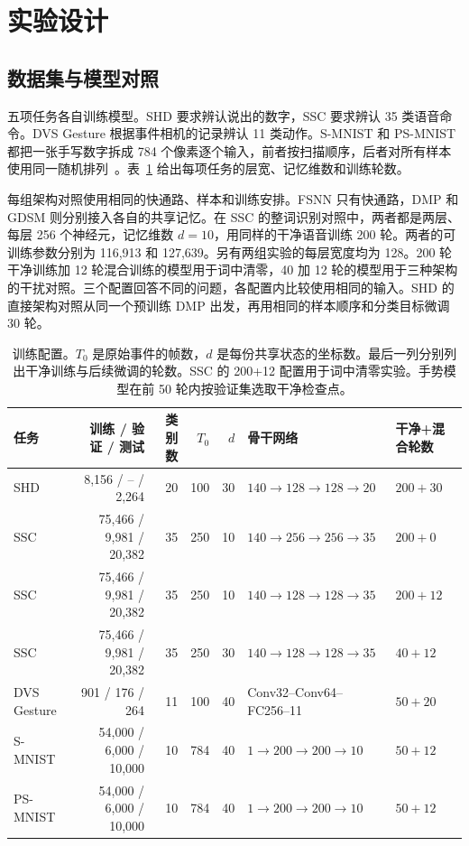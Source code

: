 \documentclass[11pt]{article}
\newcommand{\pid}[1]{\ifstrequal{#1}{摘要}{}{\leavevmode\llap{\scriptsize\sffamily #1\hspace{.65em}}}\ignorespaces}
\begin{document}
\section{实验设计}
\subsection{数据集与模型对照}
\pid{3.1-P1} 五项任务各自训练模型。SHD 要求辨认说出的数字，SSC 要求辨认 35 类语音命令。DVS Gesture 根据事件相机的记录辨认 11 类动作。S-MNIST 和 PS-MNIST 都把一张手写数字拆成 784 个像素逐个输入，前者按扫描顺序，后者对所有样本使用同一随机排列~\cite{shd,gesture,mnist}。表~\ref{tab:protocol} 给出每项任务的层宽、记忆维数和训练轮数。

\pid{3.1-P2} 每组架构对照使用相同的快通路、样本和训练安排。FSNN 只有快通路，DMP 和 GDSM 则分别接入各自的共享记忆。在 SSC 的整词识别对照中，两者都是两层、每层 256 个神经元，记忆维数 $d=10$，用同样的干净语音训练 200 轮。两者的可训练参数分别为 116,913 和 127,639。另有两组实验的每层宽度均为 128。200 轮干净训练加 12 轮混合训练的模型用于词中清零，40 加 12 轮的模型用于三种架构的干扰对照。三个配置回答不同的问题，各配置内比较使用相同的输入。SHD 的直接架构对照从同一个预训练 DMP 出发，再用相同的样本顺序和分类目标微调 30 轮。

\begin{table}[htbp]
\centering\small
\caption{训练配置。$T_0$ 是原始事件的帧数，$d$ 是每份共享状态的坐标数。最后一列分别列出干净训练与后续微调的轮数。SSC 的 200+12 配置用于词中清零实验。手势模型在前 50 轮内按验证集选取干净检查点。}
\label{tab:protocol}
\begin{lrbox}{\tablebox}\begin{tabular}{lrrrrll}
\toprule
任务 & 训练 / 验证 / 测试 & 类别数 & $T_0$ & $d$ & 骨干网络 & 干净+混合轮数\\
\midrule
SHD & 8,156 / -- / 2,264 & 20 & 100 & 30 & $140\to128\to128\to20$ & $200+30$\\
SSC & 75,466 / 9,981 / 20,382 & 35 & 250 & 10 & $140\to256\to256\to35$ & $200+0$\\
SSC & 75,466 / 9,981 / 20,382 & 35 & 250 & 10 & $140\to128\to128\to35$ & $200+12$\\
SSC & 75,466 / 9,981 / 20,382 & 35 & 250 & 30 & $140\to128\to128\to35$ & $40+12$\\
DVS Gesture & 901 / 176 / 264 & 11 & 100 & 40 & Conv32--Conv64--FC256--11 & $50+20$\\
S-MNIST & 54,000 / 6,000 / 10,000 & 10 & 784 & 40 & $1\to200\to200\to10$ & $50+12$\\
PS-MNIST & 54,000 / 6,000 / 10,000 & 10 & 784 & 40 & $1\to200\to200\to10$ & $50+12$\\
\bottomrule
\end{tabular}\end{lrbox}
\ifdim\wd\tablebox>\linewidth\resizebox{\linewidth}{!}{\usebox{\tablebox}}\else\usebox{\tablebox}\fi
\end{table}
\end{document}
